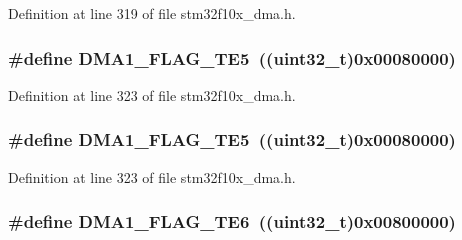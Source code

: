 Definition at line 319 of file stm32f10x\+\_\+dma.\+h.

\subsubsection[{\texorpdfstring{D\+M\+A1\+\_\+\+F\+L\+A\+G\+\_\+\+T\+E5}{DMA1_FLAG_TE5}}]{\setlength{\rightskip}{0pt plus 5cm}\#define D\+M\+A1\+\_\+\+F\+L\+A\+G\+\_\+\+T\+E5~(({\bf uint32\+\_\+t})0x00080000)}\hypertarget{group___d_m_a__flags__definition_ga17b9793d2f78c683f7c48ba4f7fa2e70}{}\label{group___d_m_a__flags__definition_ga17b9793d2f78c683f7c48ba4f7fa2e70}


Definition at line 323 of file stm32f10x\+\_\+dma.\+h.

\subsubsection[{\texorpdfstring{D\+M\+A1\+\_\+\+F\+L\+A\+G\+\_\+\+T\+E5}{DMA1_FLAG_TE5}}]{\setlength{\rightskip}{0pt plus 5cm}\#define D\+M\+A1\+\_\+\+F\+L\+A\+G\+\_\+\+T\+E5~(({\bf uint32\+\_\+t})0x00080000)}\hypertarget{group___d_m_a__flags__definition_ga17b9793d2f78c683f7c48ba4f7fa2e70}{}\label{group___d_m_a__flags__definition_ga17b9793d2f78c683f7c48ba4f7fa2e70}


Definition at line 323 of file stm32f10x\+\_\+dma.\+h.

\subsubsection[{\texorpdfstring{D\+M\+A1\+\_\+\+F\+L\+A\+G\+\_\+\+T\+E6}{DMA1_FLAG_TE6}}]{\setlength{\rightskip}{0pt plus 5cm}\#define D\+M\+A1\+\_\+\+F\+L\+A\+G\+\_\+\+T\+E6~(({\bf uint32\+\_\+t})0x00800000)}\hypertarget{group___d_m_a__flags__definition_ga231e156a0e27f7b2271ea44ca90c237d}{}\label{group___d_m_a__flags__definition_ga231e156a0e27f7b2271ea44ca90c237d}


